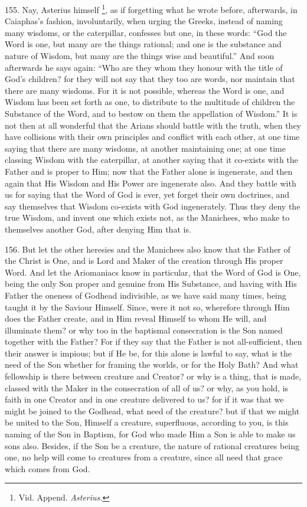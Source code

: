 155. Nay, Asterius himself \footnote{Vid. Append. \emph{Asterius.}}, as if forgetting what he wrote before, afterwards, in Caiaphas's
fashion, involuntarily, when urging the Greeks, instead of naming many
wisdoms, or the caterpillar, confesses but one, in these words: ``God
the Word is one, but many are the things rational; and one is the
substance and nature of Wisdom, but many are the things wise and
beautiful.'' And soon afterwards he says again: ``Who are they whom they
honour with the title of God's children? for they will not say that
they too are words, nor maintain that there are many wisdoms. For it
is not possible, whereas the Word is one, and Wisdom has been set
forth as one, to distribute to the multitude of children the Substance
of the Word, and to bestow on them the appellation of Wisdom.'' It is
not then at all wonderful that the Arians should battle with the
truth, when they have collisions with their own principles and
conflict with each other, at one time saying that there are many
wisdoms, at another maintaining one; at one time classing Wisdom with
the caterpillar, at another saying that it co-exists with the Father
and is proper to Him; now that the Father alone is ingenerate, and
then again that His Wisdom and His Power are ingenerate also. And they
battle with us for saying that the Word of God is ever, yet forget
their own doctrines, and say themselves that Wisdom co-exists with God
ingenerately. Thus they deny the true Wisdom, and invent one which
exists not, as the Manichees, who make to themselves another God,
after denying Him that is.

156. But let the other
heresies and the Manichees also know that the Father of the
Christ is One, and is Lord and Maker of the creation through His
proper Word. And let the Ariomaniacs know in particular, that the Word
of God is One, being the only Son proper and genuine from His
Substance, and having with His Father the oneness of Godhead
indivisible, as we have said many times, being taught it by the
Saviour Himself. Since, were it not so, wherefore through Him does the
Father create, and in Him reveal Himself to whom He will, and
illuminate them? or why too in the baptismal consecration is the Son
named together with the Father? For if they say that the Father is not
all-sufficient, then their answer is impious; but if He be, for this
alone is lawful to say, what is the need of the Son whether for
framing the worlds, or for the Holy Bath? And what fellowship is there
between creature and Creator? or why is a thing, that is made, classed
with the Maker in the consecration of all of us? or why, as you hold,
is faith in one Creator and in one creature delivered to us? for if it
was that we might be joined to the Godhead, what need of the creature?
but if that we might be united to the Son, Himself a creature,
superfluous, according to you, is this naming of the Son in Baptism,
for God who made Him a Son is able to make us sons also. Besides, if
the Son be a creature, the nature of rational creatures being one, no
help will come to creatures from a creature, since all need that grace
which comes from God.

